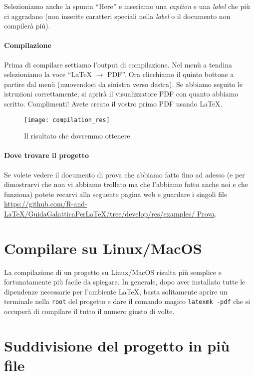 Selezioniamo anche la spunta ``Here'' e inseriamo una \textit{caption} e una
\textit{label} che più ci aggradano (non inserite caratteri speciali nella
\textit{label} o il documento non compilerà più).

\paragraph*{Compilazione} Prima di compilare settiamo l'output di compilazione.
Nel menù a tendina selezioniamo la voce ``LaTeX $\to$ PDF''. Ora clicchiamo il
quinto bottone a partire dal menù (muovendoci da sinistra verso destra). Se
abbiamo seguito le istruzioni correttamente, si aprirà il visualizzatore PDF
con quanto abbiamo scritto. Complimenti! Avete creato il vostro primo PDF
usando \LaTeX{}.

\begin{figure}[t]
 \centering
 \texttt{[image: compilation\_res]}
 \caption{Il risultato che dovremmo ottenere}
 \label{img:compilation_res}
\end{figure}

\paragraph*{Dove trovare il progetto} Se volete vedere il documento di prova
che abbiamo fatto fino ad adesso (e per dimostrarvi che non vi abbiamo
trollato ma che l'abbiamo fatto anche noi e che funziona) potete recarvi alla
seguente pagina web e guardare i singoli file
\url{
https://github.com/R-and-LaTeX/GuidaGalatticaPerLaTeX/tree/develop/res/examples/
Prova}.

\newpage

\section{Compilare su Linux/MacOS}

La compilazione di un progetto su Linux/MacOS risulta più semplice e
fortunatamente più facile da spiegare. In generale, dopo aver installato tutte
le dipendenze necessarie per l'ambiente \LaTeX{}, basta solitamente aprire un
terminale nella \texttt{root} del progetto e dare il comando magico
\texttt{latexmk -pdf} che si occuperà di compilare il tutto il numero giusto di
volte.

\section{Suddivisione del progetto in più file}
\label{sec:prog_piu_file}

